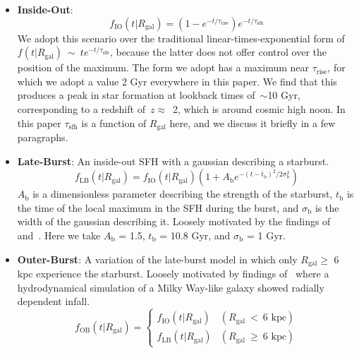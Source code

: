 \documentclass[fleqn, usenatbib]{mnras}
\begin{document}
\begin{itemize}
\begin{itemize}
		\item \textbf{Inside-Out}: 
		\begin{equation} 
		f_\text{IO}(t|R_\text{gal}) = (1 - e^{-t/\tau_\text{rise}})
		e^{-t/\tau_\text{sfh}} 
		\label{eq:insideout_sfh} 
		\end{equation} 
		We adopt this scenario over the traditional linear-times-exponential 
		form of $f(t|R_\text{gal})~\sim~te^{-t/\tau_\text{sfh}}$, because the 
		latter does not offer control over the position of the maximum. The 
		form we adopt has a maximum near $\tau_\text{rise}$, for which we adopt 
		a value 2 Gyr everywhere in this paper. We find that this produces a 
		peak in star formation at lookback times of~$\sim$10 Gyr, corresponding 
		to a redshift of~$z \approx$~2, which is around cosmic high noon. In 
		this paper $\tau_\text{sfh}$ is a function of $R_\text{gal}$ here, and 
		we discuss it briefly in a few paragraphs. 

		\item \textbf{Late-Burst}: An inside-out SFH with a gaussian describing 
		a starburst. 
		\begin{equation} 
		f_\text{LB}(t|R_\text{gal}) = f_\text{IO}(t|R_\text{gal}) 
		(1 + A_\text{b}e^{-(t - t_\text{b})^2/2\sigma_\text{b}^2}) 
		\label{eq:lateburst_sfh} 
		\end{equation} 
		$A_\text{b}$ is a dimensionless parameter describing the strength of 
		the starburst, $t_\text{b}$ is the time of the local maximum in the SFH 
		during the burst, and $\sigma_\text{b}$ is the width of the gaussian 
		describing it. Loosely motivated by the findings of~\citet{Isern2019} 
		and~\citet{Mor2019}. Here we take $A_\text{b}$ = 1.5, $t_\text{b}$ = 
		10.8 Gyr, and $\sigma_\text{b}$ = 1 Gyr. 

		\item \textbf{Outer-Burst}: A variation of the late-burst model in 
		which only $R_\text{gal}\geq$ 6 kpc experience the starburst. Loosely 
		motivated by findings of~\citet{Vincenzo2020} where a hydrodynamical 
		simulation of a Milky Way-like galaxy showed radially dependent 
		infall. 
		\begin{equation} 
		f_\text{OB}(t|R_\text{gal}) = \begin{cases} 
		f_\text{IO}(t|R_\text{gal}) & (R_\text{gal}~<~\text{6 kpc}) \\ 
		f_\text{LB}(t|R_\text{gal}) & (R_\text{gal}~\geq~\text{6 kpc}) 
		\end{cases} 
		\label{eq:outerburst_sfh} 
		\end{equation} 
	\end{itemize} 


\end{itemize}
\end{document}
